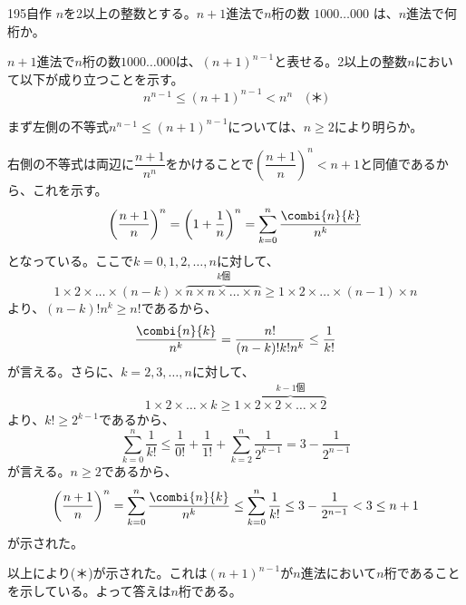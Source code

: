 \begin{thm}{195}{\maru}{自作}
 $n$を2以上の整数とする。$n+1$進法で$n$桁の数 $1000\dots000$ は、$n$進法で何桁か。
\end{thm}

$n+1$進法で$n$桁の数$1000\dots000$は、$(n+1)^{n-1}$と表せる。2以上の整数$n$において以下が成り立つことを示す。
\[ n^{n-1}\le (n+1)^{n-1} < n^n \quad \text{(＊)} \]

まず左側の不等式$n^{n-1}\le (n+1)^{n-1}$については、$n\ge 2$により明らか。

右側の不等式は両辺に$\dfrac{n+1}{n^n}$をかけることで$\left(\dfrac{n+1}{n}\right)^n<n+1$と同値であるから、これを示す。
\[ \left(\frac{n+1}{n}\right)^n = \left(1+\frac{1}{n}\right)^n=\sum_{k=0}^n\frac{\combi{n}{k}}{n^k} \]
となっている。ここで$k=0, 1, 2,\dots, n$に対して、
\[ 1\times 2\times\dots\times(n-k)\times\overbrace{n\times n\times\dots\times n}^{k\text{個}} \ge 1\times 2\times \dots\times (n-1)\times n \]
より、$(n-k)!n^k\ge n!$であるから、
\[ \frac{\combi{n}{k}}{n^k}=\frac{n!}{(n-k)! k! n^k} \le \frac{1}{k!} \]
が言える。さらに、$k=2, 3, \dots, n$に対して、
\[ 1\times 2\times \dots \times k \ge 1\times \overbrace{2\times 2\times \dots \times 2}^{k-1\text{個}} \]
より、$k!\ge 2^{k-1}$であるから、
\[ \sum_{k=0}^n \frac{1}{k!} \le \frac{1}{0!}+\frac{1}{1!}+\sum_{k=2}^n \frac{1}{2^{k-1}} = 3-\frac{1}{2^{n-1}} \]
が言える。$n\ge 2$であるから、
\[ \left(\frac{n+1}{n}\right)^n=\sum_{k=0}^n \frac{\combi{n}{k}}{n^k} \le \sum_{k=0}^n \frac{1}{k!}\le 3-\frac{1}{2^{n-1}}< 3\le n+1 \]
が示された。

以上により(＊)が示された。これは$(n+1)^{n-1}$が$n$進法において$n$桁であることを示している。よって答えは$n$桁である。